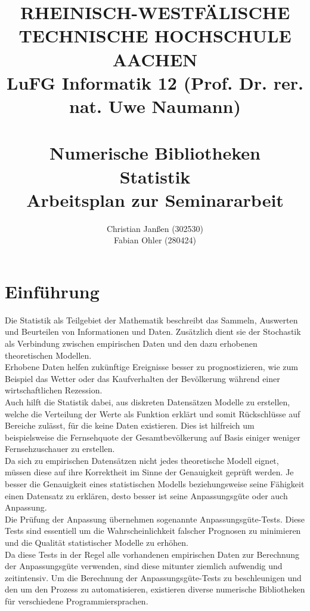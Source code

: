 \documentclass{article}
\title{
{\bf \scriptsize RHEINISCH-WESTF\"ALISCHE TECHNISCHE HOCHSCHULE AACHEN \\
LuFG Informatik 12 (Prof. Dr. rer. nat. Uwe Naumann)}
\vspace{.5cm} \\
\epsfig{file=figures/STCE_Logo_WWW.eps,width=.7\textwidth}
\vspace{1cm} \\
{\bf \Large Numerische Bibliotheken} \\
{\bf \large Statistik} \\
{\large Arbeitsplan zur Seminararbeit} 
}
\author{Christian Janßen (302530) \\ Fabian Ohler (280424) }
\begin{document}

\begin{titlepage}
\clearpage
\maketitle

\thispagestyle{empty}

\end{titlepage}

\pagestyle{headings}
\newpage
\section{Einführung}
Die Statistik als Teilgebiet der Mathematik beschreibt das Sammeln, Auswerten und Beurteilen von Informationen und Daten.
Zusätzlich dient sie der Stochastik als Verbindung zwischen empirischen Daten und den dazu erhobenen theoretischen Modellen.\\
Erhobene Daten helfen zukünftige Ereignisse besser zu prognostizieren, wie zum Beispiel das Wetter oder das Kaufverhalten der Bevölkerung während einer wirtschaftlichen Rezession.\\
Auch hilft die Statistik dabei, aus diskreten Datensätzen Modelle zu erstellen, welche die Verteilung der Werte als Funktion erklärt und somit Rückschlüsse auf Bereiche zulässt, für die keine Daten existieren. Dies ist hilfreich um beispielsweise die Fernsehquote der Gesamtbevölkerung auf Basis einiger weniger Fernsehzuschauer zu erstellen.\\
Da sich zu empirischen Datensätzen nicht jedes theoretische Modell eignet, müssen diese auf ihre Korrektheit im Sinne der Genauigkeit geprüft werden. Je besser die Genauigkeit eines statistischen Modells beziehungsweise seine Fähigkeit einen Datensatz zu erklären, desto besser ist seine Anpassungsgüte oder auch Anpassung.\\
Die Prüfung der Anpassung übernehmen sogenannte Anpassungsgüte-Tests. Diese Tests sind essentiell um die Wahrscheinlichkeit falscher Prognosen zu minimieren und die Qualität statistischer Modelle zu erhöhen.\\
Da diese Tests in der Regel alle vorhandenen empirischen Daten zur Berechnung der Anpassungsgüte verwenden, sind diese mitunter ziemlich aufwendig und zeitintensiv. Um die Berechnung der Anpassungsgüte-Tests zu beschleunigen und den um den Prozess zu automatisieren, existieren diverse numerische Bibliotheken für verschiedene Programmiersprachen.\\
\end{document}
